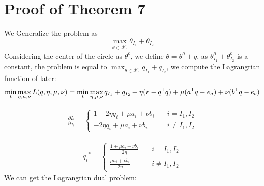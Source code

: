 \section{Proof of Theorem 7}
We Generalize the problem as 
\begin{equation}
\max_{\theta \in \mathcal{R}^{S}_{I}}{ \theta_{I_1} +\theta_{I_2} }
\end{equation}
Considering the center of the circle as $\theta^o$, we define $\theta = \theta^{o} + q$, as ${ \theta^{o}_{I_1} +\theta^{o}_{I_2} }$ is a constant, the problem is equal to  $\max_{\theta \in \mathcal{R}^{S}_{I}}{ q_{I_1} +q_{I_2} }$, we compute the Lagrangrian function of later:
\begin{equation}
\min_{t} \max_{\eta,\mu,\nu}  L(q,\eta,\mu,\nu) =\min_{t}\max_{\eta,\mu,\nu}   {q_{I_1} +q_{I_2}  + \eta(r - q^{\mathsf T}q )+\mu( a^{\mathsf T}q - e_a ) + \nu( b^{\mathsf T}q - e_b )}
\end{equation}

 \begin{equation}
\begin{split} 
\frac{\partial L}{\partial q_i} =  \left\{
\begin{aligned}
1 - 2\eta q_i +\mu a_i + \nu b_i \quad&  i = I_1, I_2\\
 - 2\eta q_i +\mu a_i + \nu b_i \quad&  i \neq I_1, I_2
\end{aligned}
\right.
 \end{split}
\label{eq:lang1}
\end{equation}

 \begin{equation}
\begin{split} 
{q_i}^{*} =  \left\{
\begin{aligned}
\frac{1+\mu a_i + \nu b_i}{2\eta} \quad&  i = I_1, I_2\\
\frac{\mu a_i + \nu b_i}{2\eta} \quad&  i \neq I_1, I_2
\end{aligned}
\right.
 \end{split}
\label{eq:lang1}
\end{equation}
We can get the Lagrangrian dual problem:

